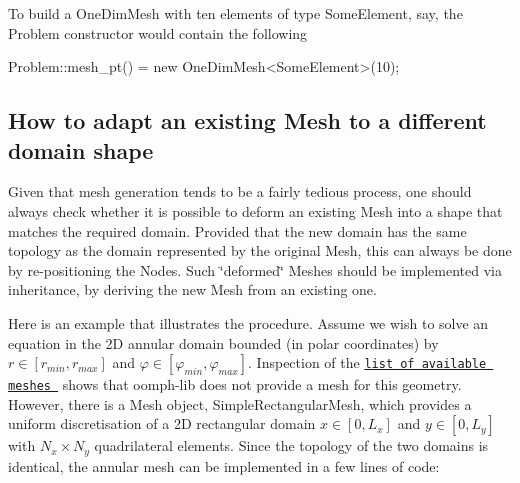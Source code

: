 To build a {\ttfamily One\+Dim\+Mesh} with ten elements of type {\ttfamily Some\+Element}, say, the {\ttfamily Problem} constructor would contain the following 
\begin{DoxyCode}
Problem::mesh\_pt() = \textcolor{keyword}{new} OneDimMesh<SomeElement>(10);
\end{DoxyCode}
\hypertarget{index_distorted_mesh}{}\subsection{How to adapt an existing Mesh to a different domain shape}\label{index_distorted_mesh}
Given that mesh generation tends to be a fairly tedious process, one should always check whether it is possible to deform an existing {\ttfamily Mesh} into a shape that matches the required domain. Provided that the new domain has the same topology as the domain represented by the original {\ttfamily Mesh}, this can always be done by re-\/positioning the Nodes. Such \char`\"{}deformed\char`\"{} {\ttfamily Meshes} should be implemented via inheritance, by deriving the new {\ttfamily Mesh} from an existing one.

Here is an example that illustrates the procedure. Assume we wish to solve an equation in the 2D annular domain bounded (in polar coordinates) by $ r \in [r_{min}, r_{max}] $ and $ \varphi \in [\varphi_{min}, \varphi_{max}] $. Inspection of the \href{../../meshes/mesh_list/html/index.html}{\tt list of available meshes } shows that {\ttfamily oomph-\/lib} does not provide a mesh for this geometry. However, there is a {\ttfamily Mesh} object, {\ttfamily Simple\+Rectangular\+Mesh}, which provides a uniform discretisation of a 2D rectangular domain $ x\in [0,L_x] $ and $ y \in [0,L_y] $ with $ N_x \times N_y $ quadrilateral elements. Since the topology of the two domains is identical, the annular mesh can be implemented in a few lines of code\+:


